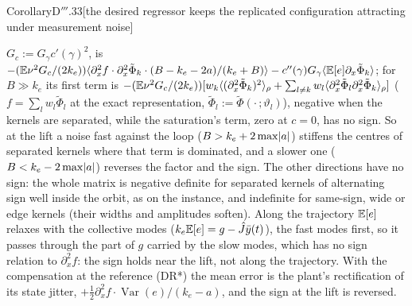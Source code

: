 \begin{thm}{Corollary}{D$'''$.33}[the desired regressor keeps the replicated configuration attracting under
measurement noise]
\begin{enumerate}[label=\textup{(\roman*)}]
    $G_c := G_\gamma c'(\gamma)^2$, is
    $-(\mathbb{E}\nu^2G_c/(2k_e))\langle\partial^2_xf\cdot\partial^2_x\tilde\Phi_k\cdot(B - k_e - 2a)/(k_e + B)\rangle
    - c''(\gamma)G_\gamma\langle\mathbb{E}[e]\partial_x\tilde\Phi_k\rangle$; for $B\gg k_e$ its first term is
    $-(\mathbb{E}\nu^2G_c/(2k_e))[w_k\langle(\partial^2_x\tilde\Phi_k)^2\rangle_\rho
    + \sum_{l\ne k}w_l\langle\partial^2_x\tilde\Phi_l\partial^2_x\tilde\Phi_k\rangle_\rho]$
    ($f = \sum_lw_l\tilde\Phi_l$ at the exact representation, $\tilde\Phi_l := \tilde\Phi(\cdot\,;\vartheta_l)$),
    negative when the kernels are separated, while the saturation's term, zero at $c = 0$, has no sign. So at the
    lift a noise fast against the loop ($B > k_e + 2\max\lvert a\rvert$) stiffens the centres of separated kernels where
    that term is dominated, and a slower one ($B < k_e - 2\max\lvert a\rvert$) reverses the factor and the sign. The other
    directions have no sign: the whole matrix is negative definite for separated kernels of alternating sign well
    inside the orbit, as on the instance, and indefinite for same-sign, wide or edge kernels (their widths and
    amplitudes soften). Along the trajectory $\mathbb{E}[e]$ relaxes with the collective modes
    ($k_e\mathbb{E}[e] = g - \hat J\bar y(t)$), the fast modes first, so it passes through the part of $g$ carried by the slow
    modes, which has no sign relation to $\partial^2_xf$: the sign holds near the lift, not along the trajectory.
    With the compensation at the reference (DR*) the mean error is the plant's rectification of its state jitter,
    $+\frac12\partial^2_xf\cdot\operatorname{Var}(e)/(k_e - a)$, and the sign at the lift is reversed.
\end{enumerate}
\end{thm}

